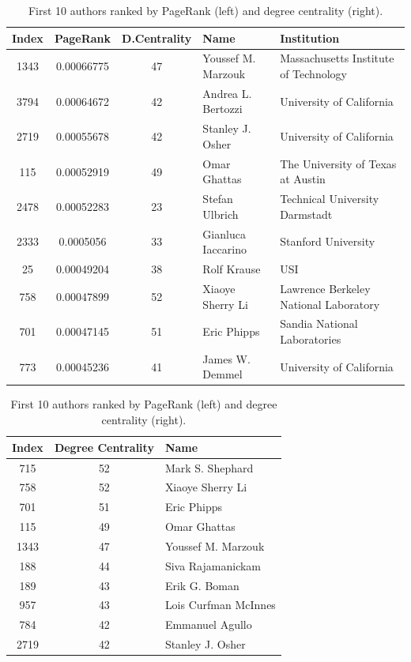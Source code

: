 \documentclass[]{usiinfbachelorproject}
\begin{document}
\newcommand\eee{\centering}
\begin{table}[t]
\centering
\tiny
\caption{First 10 authors ranked by PageRank (left) and degree centrality (right).}
\begin{tabular}{c c c l l}
\textbf{Index} & \textbf{PageRank} & \textbf{D.Centrality} & \textbf{Name} & \textbf{Institution}\\
\hline
1343 & 0.00066775 & 47 & Youssef M. Marzouk & Massachusetts Institute of Technology \\
3794 & 0.00064672 & 42 & Andrea L. Bertozzi & University of California \\
2719 & 0.00055678 & 42 & Stanley J. Osher & University of California \\
115 & 0.00052919 & 49 & Omar Ghattas & The University of Texas at Austin \\
2478 & 0.00052283 & 23 & Stefan Ulbrich & Technical University Darmstadt \\
2333 & 0.0005056 & 33 & Gianluca Iaccarino & Stanford University \\
25 & 0.00049204 & 38 & Rolf Krause & USI \\
758 & 0.00047899 & 52 & Xiaoye Sherry Li & Lawrence Berkeley National Laboratory \\
701 & 0.00047145 & 51 & Eric Phipps & Sandia National Laboratories \\
773 & 0.00045236 & 41 & James W. Demmel& University of California
\end{tabular}
\qquad\qquad
\begin{tabular}{c c l}
\textbf{Index} & \textbf{Degree Centrality} & \textbf{Name} \\
\hline
715& 52 & Mark S. Shephard \\
758 & 52 & Xiaoye Sherry Li \\
701 & 51 & Eric Phipps\\
115 &49 & Omar Ghattas \\
1343 & 47 & Youssef M. Marzouk\\
188 & 44 & Siva Rajamanickam\\
189 & 43 & Erik G. Boman\\
957 & 43 & Lois Curfman McInnes\\
784 & 42 & Emmanuel Agullo \\
2719 & 42 & Stanley J. Osher
\end{tabular}
\label{table:prW}
\end{table}
\end{document}
